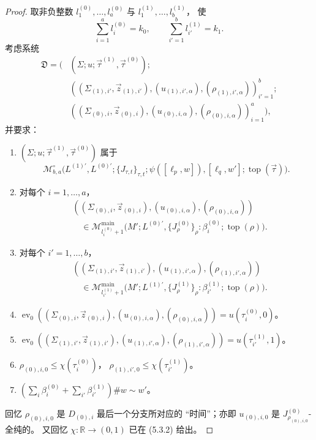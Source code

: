 \begin{proof}
取非负整数
$l_1^{(0)},\ldots,l_a^{(0)}$
与 $l_1^{(1)},\ldots,l_b^{(1)}$，
使
\[
\sum_{i=1}^{a}l_i^{(0)}=k_0,
\qquad
\sum_{i'=1}^{b}l_{i'}^{(1)}=k_1.
\]
考虑系统
\[
\begin{aligned}
\mathfrak D
=\bigl(
 &(\Sigma;u;\vec\tau^{(1)},\vec\tau^{(0)});
\\[-1mm]
 &((\Sigma_{(1),i'},\vec z_{(1),i'}),
   (u_{(1),i',\alpha}),
   (\rho_{(1),i',\alpha}))_{i'=1}^{b};
\\[-1mm]
 &((\Sigma_{(0),i},\vec z_{(0),i}),
   (u_{(0),i,\alpha}),
   (\rho_{(0),i,\alpha}))_{i=1}^{a}
\bigr),
\end{aligned}
\]
并要求：
\begin{enumerate}[
 label=\textup{(5.3.5.\arabic*)},
 leftmargin=5.9em]
\item\label{cond:5-3-5-1}
$(\Sigma;u;\vec\tau^{(1)},\vec\tau^{(0)})$
属于
\[
\mathcal M^\circ_{b,a}
\bigl(
L^{(1)\prime},L^{(0)\prime};
\{J_{\tau,t}\}_{\tau,t};
\psi([\ell_p,w]),[\ell_q,w'];
\operatorname{top}(\vec\tau)
\bigr).
\]
\item\label{cond:5-3-5-2}
对每个 $i=1,\ldots,a$，
\[
\begin{aligned}
&((\Sigma_{(0),i},\vec z_{(0),i}),
 (u_{(0),i,\alpha}),
 (\rho_{(0),i,\alpha}))
\\[-1mm]
&\quad\in
\mathcal M_{l_i^{(0)}+1}^{\mathrm{main}}
\bigl(
 M';L^{(0)\prime},
 \{J^{(0)}_\rho\}_\rho:\beta_i^{(0)};
 \operatorname{top}(\rho)
\bigr).
\end{aligned}
\]
\item\label{cond:5-3-5-3}
对每个 $i'=1,\ldots,b$，
\[
\begin{aligned}
&((\Sigma_{(1),i'},\vec z_{(1),i'}),
 (u_{(1),i',\alpha}),
 (\rho_{(1),i',\alpha}))
\\[-1mm]
&\quad\in
\mathcal M_{l_{i'}^{(1)}+1}^{\mathrm{main}}
\bigl(
 M';L^{(1)\prime},
 \{J^{(1)}_\rho\}_\rho:\beta_{i'}^{(1)};
 \operatorname{top}(\rho)
\bigr).
\end{aligned}
\]
\item\label{cond:5-3-5-4}
$\operatorname{ev}_0
((\Sigma_{(0),i},\vec z_{(0),i}),
 (u_{(0),i,\alpha}),
 (\rho_{(0),i,\alpha}))
=u(\tau_i^{(0)},0)$。
\item\label{cond:5-3-5-5}
$\operatorname{ev}_0
((\Sigma_{(1),i'},\vec z_{(1),i'}),
 (u_{(1),i',\alpha}),
 (\rho_{(1),i',\alpha}))
=u(\tau_{i'}^{(1)},1)$。
\item\label{cond:5-3-5-6}
$\rho_{(0),i,0}\le\chi(\tau_i^{(0)})$，
$\rho_{(1),i',0}\le\chi(\tau_{i'}^{(1)})$。
\item\label{cond:5-3-5-7}
$(\sum_i\beta_i^{(0)}
 +\sum_{i'}\beta_{i'}^{(1)})\#w
\sim w'$。
\end{enumerate}
回忆 $\rho_{(0),i,0}$
是 $D_{(0),i}$ 最后一个分支所对应的
“时间”；亦即
$u_{(0),i,0}$
是 $J^{(0)}_{\rho_{(0),i,0}}$-全纯的。
又回忆 $\chi\colon\mathbb R\to(0,1)$
已在 (5.3.2) 给出。


\end{proof}
